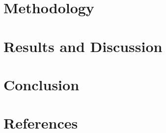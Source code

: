 \documentclass[12pt, a4paper]{article}
\begin{document}
\section{Methodology}

\section{Results and Discussion}

\section{Conclusion}

\section{References}
\end{document}
